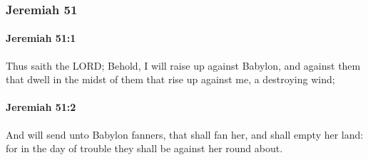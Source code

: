 	\subsubsection{Jeremiah 51} %
		\label{JEREMIAH-51}

		\paragraph{Jeremiah 51:1} %
			\label{JEREMIAH-51-1}

			Thus saith the LORD; Behold, I will raise up against Babylon, and against them that dwell in the midst of them that rise up against me, a destroying wind;


		\paragraph{Jeremiah 51:2} %
			\label{JEREMIAH-51-2}

			And will send unto Babylon fanners, that shall fan her, and shall empty her land: for in the day of trouble they shall be against her round about.

